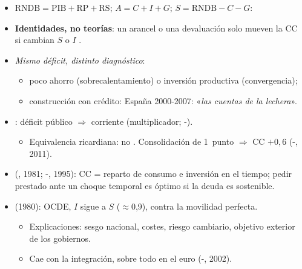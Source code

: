 \documentclass{article}
\begin{document}
\begin{columnas}
\begin{itemize}
\item $\mathrm{RNDB}=\mathrm{PIB}+\mathrm{RP}+\mathrm{RS}$; $A=C+I+G$; $S=\mathrm{RNDB}-C-G$:
\item \textbf{Identidades, no teorías}: un arancel o una devaluación solo mueven la CC si cambian $S$ o $I$ .
\item \emph{Mismo déficit, distinto diagnóstico}:
  \begin{itemize}
  \item poco ahorro (sobrecalentamiento) o inversión productiva (convergencia);
  \item construcción con crédito: España 2000-2007: «\emph{las cuentas de la lechera}».
  \end{itemize}
\end{itemize}
\begin{itemize}
\item {}: déficit público $\Rightarrow$ corriente (multiplicador; -).
  \begin{itemize}
  \item Equivalencia ricardiana: no . Consolidación de 1~punto $\Rightarrow$ CC $+0{,}6$ (-, 2011).
  \end{itemize}
\item {} (, 1981; -, 1995): CC = reparto de consumo e inversión en el tiempo; pedir prestado ante un choque temporal es óptimo si la deuda es sostenible.
\item {} (1980): OCDE, $I$ sigue a $S$ ($\approx$0,9), contra la movilidad perfecta.
  \begin{itemize}
  \item Explicaciones: sesgo nacional, costes, riesgo cambiario, objetivo exterior de los gobiernos.
  \item Cae con la integración, sobre todo en el euro (-, 2002).
  \end{itemize}
\end{itemize}


\end{columnas}
\end{document}
